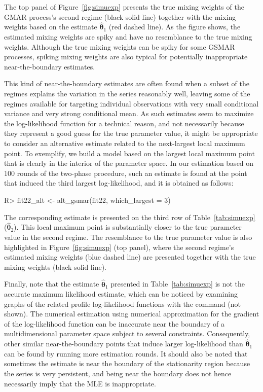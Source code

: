 \documentclass[nojss]{jss} %
\begin{document}
\begin{appendix}
The top panel of Figure~\ref{fig:simuexp} presents the true mixing weights of the GMAR process's second regime (black solid line) together with the mixing weights based on the estimate $\hat{\boldsymbol{\theta}}_1$ (red dashed line). As the figure shows, the estimated mixing weights are spiky and have no resemblance to the true mixing weights. Although the true mixing weights can be spiky for some GSMAR processes, spiking mixing weights are also typical for potentially inappropriate near-the-boundary estimates.

This kind of near-the-boundary estimates are often found when a subset of the regimes explains the variation in the series reasonably well, leaving some of the regimes available for targeting individual observations with very small conditional variance and very strong conditional mean. As such estimates seem to maximize the log-likelihood function for a technical reason, and not necessarily because they represent a good guess for the true parameter value, it might be appropriate to consider an alternative estimate related to the next-largest local maximum point. To exemplify, we build a model based on the largest local maximum point that is clearly in the interior of the parameter space. In our estimation based on $100$ rounds of the two-phase procedure, such an estimate is found at the point that induced the third largest log-likelihood, and it is obtained as follows:
%
\begin{CodeChunk}
\begin{CodeInput}
R> fit22_alt <- alt_gsmar(fit22, which_largest = 3)
\end{CodeInput}
\end{CodeChunk}
%
The corresponding estimate is presented on the third row of Table~\ref{tab:simuexp} ($\hat{\boldsymbol{\theta}}_2$). This local maximum point is substantially closer to the true parameter value in the second regime. The resemblance to the true parameter value is also highlighted in Figure~\ref{fig:simuexp} (top panel), where the second regime's estimated mixing weights (blue dashed line) are presented together with the true mixing weights (black solid line).

Finally, note that the estimate $\hat{\boldsymbol{\theta}}_1$ presented in Table~\ref{tab:simuexp} is not the accurate maximum likelihood estimate, which can be noticed by examining graphs of the related profile log-likelihood functions with the command  (not shown). The numerical estimation using numerical approximation for the gradient of the log-likelihood function can be inaccurate near the boundary of a multidimensional parameter space subject to several constraints. Consequently, other similar near-the-boundary points that induce larger log-likelihood than $\hat{\boldsymbol{\theta}}_1$ can be found by running more estimation rounds. It should also be noted that sometimes the estimate is near the boundary of the stationarity region because the series is very persistent, and being near the boundary does not hence necessarily imply that the MLE is inappropriate.


\end{appendix}
\end{document}

